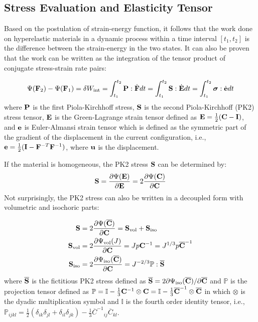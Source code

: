 %
\subsection{Stress Evaluation and Elasticity Tensor} \label{general_stress}
Based on the postulation of strain-energy function, it follows that the work done on hyperelastic materials in a dynamic process within a time interval $[t_1, t_2]$ is the difference between the strain-energy in the two states. It can also be proven that the work can be written as the integration of the tensor product of conjugate stress-strain rate pairs:

\begin{equation}
\Psi(\bold{F}_2) - \Psi(\bold{F}_1) = \delta{W_\mathrm{int}} = \int_{t_1}^{t_2}\bold{P}:\dot{\bold{F}}dt = \int_{t_1}^{t_2}\bold{S}:\dot{\bold{E}}dt = 
\int_{t_1}^{t_2}\boldsymbol{\sigma}:\dot{\bold{e}}dt
\end{equation}
where $\bold{P}$ is the first Piola-Kirchhoff stress, $\bold{S}$ is the second Piola-Kirchhoff (PK2) stress tensor, $\bold{E}$ is the Green-Lagrange strain tensor defined as $\bold{E} = \frac{1}{2}(\bold{C} - \bold{I})$, and $\bold{e}$ is Euler-Almansi strain tensor which is defined as the symmetric part of the gradient of the displacement in the current configuration, i.e., $\bold{e} = \frac{1}{2}( \bold{I} - {\bold{F}}^{-T}{\bold{F}}^{-1} )$, where $\bold{u}$ is the displacement.

If the material is homogeneous, the PK2 stress $\bold{S}$ can be determined by: 
\begin{equation}
\bold{S}  = \frac{\partial\Psi(\bold{E})}{\partial{\bold{E}}} = 2\frac{\partial\Psi(\bold{C})}{\partial{\bold{C}}}\end{equation}
Not surprisingly, the PK2 stress can also be written in a decoupled form with volumetric and isochoric parts:

\begin{subequations}
\label{S}
\begin{align}
\bold{S} &=  2\frac{\partial{\Psi(\overline{\bold{C}})}}{\partial{\bold{C}}} = \bold{S}_\mathrm{vol}  + \bold{S}_\mathrm{iso} 
\label {Stotal} \\
\bold{S}_\mathrm{vol} &= 2\frac{\partial{\Psi_\mathrm{vol}(J)}}{\partial{\bold{C}}} = Jp{\bold{C}} ^{-1} = J^{1/3}p{\overline{\bold{C}}}^{-1} 
\label{Svol} \\
\bold{S}_\mathrm{iso}  &= 2\frac{\partial{\Psi_\mathrm{iso}({\overline{\bold{C}})}}}{\partial{\bold{C}}} = J^{-2/3}\mathbb{P}:\overline{\bold{S}}
\label{Siso}
\end{align}
\end{subequations}
where  $\overline{\bold{S}}$ is the fictitious PK2 stress defined as
$\overline{\bold{S}} = 2{\partial\Psi_\mathrm{iso}({\overline{\bold{C}})}} / {\partial\overline{\bold{C}}}$
and $\mathbb{P}$ is the projection tensor defined as $\mathbb{P} = \mathbb{I} - \frac{1}{3}\bold{C}^{-1} \otimes \bold{C} = \mathbb{I} - \frac{1}{3}\overline{\bold{C}}^{-1} \otimes \overline{\bold{C}} $ in which $\otimes$ is the dyadic multiplication symbol and $\mathbb{I}$ is the fourth order identity tensor, i.e.,  $\mathbb{P}_{ijkl} =  \frac{1}{2}(\delta_{ik}\delta_{jl} + \delta_{il}\delta_{jk}) - \frac{1}{3} {\overline{{C}}^{-1}}_{ij} {\overline{C}}_{kl}$.

